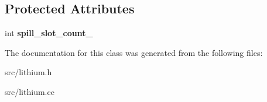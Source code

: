 \subsection*{Protected Attributes}
\begin{DoxyCompactItemize}
\item 
\hypertarget{classv8_1_1internal_1_1_l_chunk_a3f9e9cfe351aeab30023df08daf439d3}{}int {\bfseries spill\+\_\+slot\+\_\+count\+\_\+}\label{classv8_1_1internal_1_1_l_chunk_a3f9e9cfe351aeab30023df08daf439d3}

\end{DoxyCompactItemize}


The documentation for this class was generated from the following files\+:\begin{DoxyCompactItemize}
\item 
src/lithium.\+h\item 
src/lithium.\+cc\end{DoxyCompactItemize}

